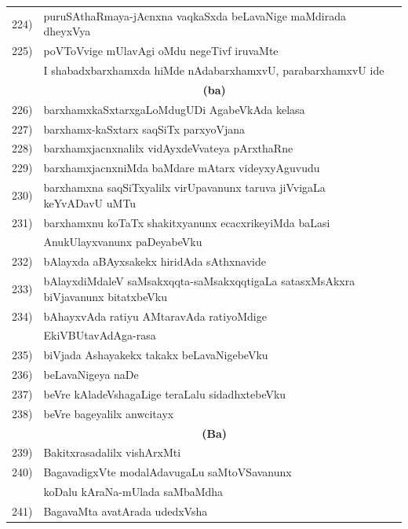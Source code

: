 \begin{longtable}{@{}cp{7.4cm}r}
224) & puruSAthaRmaya-jAcnxna vaqkaSxda beLavaNige maMdirada dheyxVya & \pageref{page65}\\
225) & poVToVvige mUlavAgi oMdu negeTivf iruvaMte  & \\
     & I shabadxbarxhamxda hiMde nAdabarxhamxvU, parabarxhamxvU ide & \pageref{page199}\\[0.4cm]
     &  \multicolumn{1}{c}{\textbf{(ba)}} & \\[0.4cm]
226) & barxhamxkaSxtarxgaLoMdugUDi AgabeVkAda kelasa & \pageref{page92}\\
227) & barxhamx-kaSxtarx saqSiTx parxyoVjana & \pageref{page91}\\
228) & barxhamxjacnxnalilx vidAyxdeVvateya pArxthaRne & \pageref{page85}\\
229) & barxhamxjacnxniMda baMdare mAtarx videyxyAguvudu & \pageref{page85a}\\  
230) & barxhamxna saqSiTxyalilx virUpavanunx taruva jiVvigaLa keYvADavU uMTu & \pageref{page192a}\\
231) & barxhamxnu koTaTx shakitxyanunx ecacxrikeyiMda baLasi & \\
     & AnukUlayxvanunx paDeyabeVku & \pageref{page193}\\
232) & bAlayxda aBAyxsakekx hiridAda sAthxnavide & \pageref{page213a}\\
233) & bAlayxdiMdaleV saMsakxqqta-saMsakxqqtigaLa satasxMsAkxra biVjavanunx bitatxbeVku & \pageref{page53}\\
234) &  bAhayxvAda ratiyu AMtaravAda ratiyoMdige & \\
     & EkiVBUtavAdAga-rasa & \pageref{page228}\\
235) & biVjada Ashayakekx takakx beLavaNigebeVku & \pageref{page70}\\
236) & beLavaNigeya naDe & \pageref{page66}\\
237) & beVre kAladeVshagaLige teraLalu sidadhxtebeVku & \pageref{page126}\\
238) & beVre bageyalilx anwcitayx & \pageref{page117a}\\[0.3cm]
     &  \multicolumn{1}{c}{\textbf{(Ba)}} & \\[0.3cm]
239) & Bakitxrasadalilx vishArxMti & \pageref{page231}\\
240) & BagavadigxVte modalAdavugaLu saMtoVSavanunx & \\
     & koDalu kAraNa-mUlada saMbaMdha & \pageref{page195}\\  
241) & BagavaMta avatArada udedxVsha & \pageref{page72a}\\

\end{longtable}
